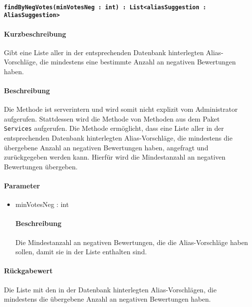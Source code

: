 \paragraph{\texttt{findByNegVotes(minVotesNeg : int) : List<aliasSuggestion : AliasSuggestion>}}%
\paragraph*{Kurzbeschreibung}
Gibt eine Liste aller in der entsprechenden Datenbank hinterlegten Alias-Vorschläge, die mindestens eine bestimmte Anzahl an negativen Bewertungen haben.
\paragraph*{Beschreibung}
Die Methode ist serverintern und wird somit nicht explizit vom Administrator aufgerufen.
Stattdessen wird die Methode von Methoden aus dem Paket \texttt{Services} aufgerufen.
Die Methode ermöglicht, dass eine Liste aller in der entsprechenden Datenbank hinterlegten Alias-Vorschläge, die mindestens die übergebene Anzahl an negativen Bewertungen haben, angefragt und zurückgegeben werden kann.
Hierfür wird die Mindestanzahl an negativen Bewertungen übergeben.
\paragraph*{Parameter}
\begin{itemize}
    \item minVotesNeg : int
    		\paragraph*{Beschreibung}
    		Die Mindestanzahl an negativen Bewertungen, die die Alias-Vorschläge haben sollen, damit sie in der Liste enthalten sind.
\end{itemize}
\paragraph*{Rückgabewert}
Die Liste mit den in der Datenbank hinterlegten Alias-Vorschlägen, die mindestens die übergebene Anzahl an negativen Bewertungen haben.
